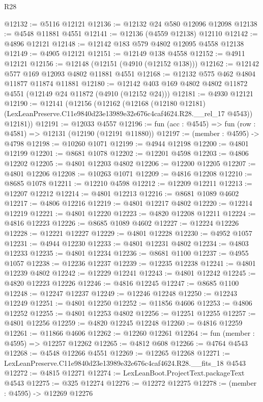 \begin{lexlean}{R28}
\begin{coremodule}
@12132 := @5116 @12121
@12136 := @12132 @24 @580 @12096 @12098
@12138 := @4548 @11881 @4551
@12141 := @12136 (@4559 @12138) @12110
@12142 := @4896 @12121
@12148 := @12142 @183 @579 @4802 @12095 @4558 @12138
@12149 := @4905 @12121
@12151 := @12149 @138 @4558
@12152 := @4911 @12121
@12156 := @12148 (@12151 (@4910 (@12152 @138)))
@12162 := @12142 @577 @169 @12093 @4802 @11881 @4551
@12168 := @12132 @575 @462 @4804 @11877 @11874 @11881
@12180 := @12142 @403 @169 @4802 @4802 @11872 @4551 (@12149 @24 @11872 (@4910 (@12152 @24)))
@12181 := @4930 @12121
@12190 := @12141
    (@12156
      (@12162
        (@12168
          (@12180 @12181)
          (LexLeanPreserve.C11e9840d23e13989e32e676c4caf4624.R28.__rel_17 @4543))
        @12181))
@12191 := @12033 @4557
@12196 := fun (acc : @4545) => fun (row : @4581) => @12131 (@12190 (@12191 @11880))
@12197 := (member : @4595) -> @4798
@12198 := @10260 @1071
@12199 := @4944 @12198
@12200 := @4801 @12199
@12201 := @8681 @1078
@12202 := @12201 @4598
@12203 := @4806 @12202
@12205 := @4801 @12203 @4802
@12206 := @12200 @12205
@12207 := @4801 @12206
@12208 := @10263 @1071
@12209 := @4816 @12208
@12210 := @8685 @1078
@12211 := @12210 @4598
@12212 := @12209 @12211
@12213 := @12207 @12212
@12214 := @4801 @12213
@12216 := @8681 @1089 @4602
@12217 := @4806 @12216
@12219 := @4801 @12217 @4802
@12220 := @12214 @12219
@12221 := @4801 @12220
@12223 := @4820 @12208 @12211
@12224 := @4816 @12223
@12226 := @8685 @1089 @4602
@12227 := @12224 @12226
@12228 := @12221 @12227
@12229 := @4801 @12228
@12230 := @4952 @1057
@12231 := @4944 @12230
@12233 := @4801 @12231 @4802
@12234 := @4803 @12233
@12235 := @4801 @12234
@12236 := @8681 @1100
@12237 := @4955 @1057
@12238 := @12236 @12237
@12239 := @12235 @12238
@12241 := @4801 @12239 @4802
@12242 := @12229 @12241
@12243 := @4801 @12242
@12245 := @4820 @12223 @12226
@12246 := @4816 @12245
@12247 := @8685 @1100
@12248 := @12247 @12237
@12249 := @12246 @12248
@12250 := @12243 @12249
@12251 := @4801 @12250
@12252 := @11856 @4606
@12253 := @4806 @12252
@12255 := @4801 @12253 @4802
@12256 := @12251 @12255
@12257 := @4801 @12256
@12259 := @4820 @12245 @12248
@12260 := @4816 @12259
@12261 := @11866 @4606
@12262 := @12260 @12261
@12264 := fun (member : @4595) => @12257 @12262
@12265 := @4812 @608
@12266 := @4764 @4543
@12268 := @4548 @12266 @4551
@12269 := @12265 @12268
@12271 := LexLeanPreserve.C11e9840d23e13989e32e676c4caf4624.R28.__fits_18 @4543
@12272 := @4815 @12271
@12274 := LexLeanBoot.ProjectText.packageText @4543
@12275 := @325 @12274
@12276 := @12272 @12275
@12278 := (member : @4595) -> @12269 @12276

\end{coremodule}
\end{lexlean}
